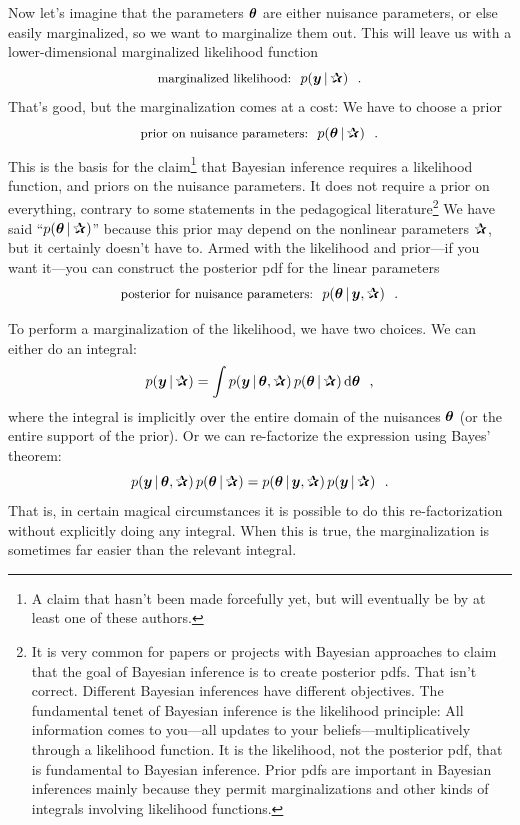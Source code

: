 Now let's imagine that the parameters $\boldsymbol{\theta}$ are either nuisance
parameters, or else easily marginalized, so we want to marginalize
them out.
This will leave us with a lower-dimensional marginalized likelihood
function
\begin{equation}
\mbox{\small marginalized likelihood:} \hquad p(\vy\given\bP) \hquad.
\end{equation}
That's good, but the marginalization comes at a cost:
We have to choose a prior
\begin{equation}
\mbox{\small prior on nuisance parameters:} \hquad p(\vtheta\given\bP) \hquad.
\end{equation}
This is the basis for the claim\footnote{A claim that hasn't been made forcefully
  yet, but will eventually be by at least one of these authors.} that Bayesian
inference requires a likelihood function, and priors on the nuisance parameters.
It does not require a prior on everything, contrary to some statements
in the pedagogical literature\footnote{It is very common for papers or projects with
  Bayesian approaches to claim that the
  goal of Bayesian inference is to create posterior pdfs. That isn't correct.
  Different Bayesian inferences have different objectives. The fundamental tenet
  of Bayesian inference is the likelihood principle: All information comes to
  you---all updates to your beliefs---multiplicatively through a likelihood
  function. It is the likelihood, not the posterior pdf, that is fundamental to Bayesian
  inference. Prior pdfs are important in Bayesian inferences mainly because they permit
  marginalizations and other kinds of integrals involving likelihood functions.}
We have said ``$p(\vtheta\given\bP)$'' because this prior may depend on
the nonlinear parameters $\bP$, but it certainly doesn't have to.
Armed with the likelihood and prior---if you want it---you can construct
the posterior pdf for the linear parameters
\begin{equation}
\mbox{\small posterior for nuisance parameters:} \hquad p(\vtheta\given\vy,\bP) \hquad.
\end{equation}

To perform a marginalization of the likelihood, we have two choices.
We can either do an integral:
\begin{equation}
p(\vy\given\bP) = \int p(\vy\given\vtheta,\bP)\,p(\vtheta\given\bP)\,\dd\vtheta
\hquad,
\end{equation}
where the integral is implicitly over the entire domain of the
nuisances $\boldsymbol{\theta}$ (or the entire support of the prior).
Or we can re-factorize the expression using Bayes' theorem:
\begin{equation}
p(\vy\given\vtheta,\bP)\,p(\vtheta\given\bP)
 = p(\vtheta\given\vy,\bP)\,p(\vy\given\bP)
\hquad.
\end{equation}
That is, in certain magical circumstances it is possible to do this
re-factorization without explicitly doing any integral.
When this is true, the marginalization is sometimes far easier than
the relevant integral.


